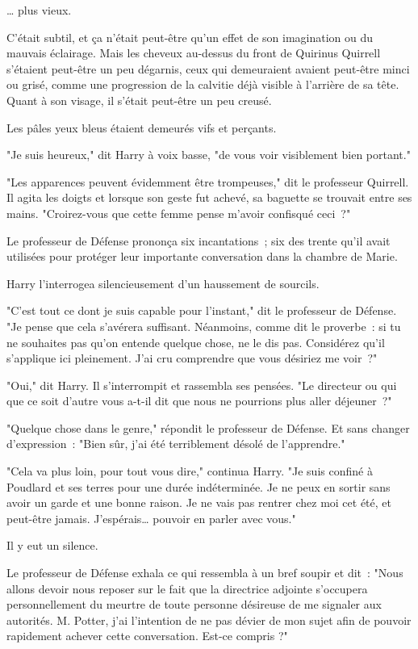 … plus vieux.

C'était subtil, et ça n'était peut-être qu'un effet de son imagination ou du mauvais éclairage. Mais les cheveux au-dessus du front de Quirinus Quirrell s'étaient peut-être un peu dégarnis, ceux qui demeuraient avaient peut-être minci ou grisé, comme une progression de la calvitie déjà visible à l'arrière de sa tête. Quant à son visage, il s'était peut-être un peu creusé.

Les pâles yeux bleus étaient demeurés vifs et perçants.

"Je suis heureux," dit Harry à voix basse, "de vous voir visiblement bien portant."

"Les apparences peuvent évidemment être trompeuses," dit le professeur Quirrell. Il agita les doigts et lorsque son geste fut achevé, sa baguette se trouvait entre ses mains. "Croirez-vous que cette femme pense m'avoir confisqué ceci~?"

Le professeur de Défense prononça six incantations~; six des trente qu'il avait utilisées pour protéger leur importante conversation dans la chambre de Marie.

Harry l'interrogea silencieusement d'un haussement de sourcils.

"C'est tout ce dont je suis capable pour l'instant," dit le professeur de Défense. "Je pense que cela s'avérera suffisant. Néanmoins, comme dit le proverbe~: si tu ne souhaites pas qu'on entende quelque chose, ne le dis pas. Considérez qu'il s'applique ici pleinement. J'ai cru comprendre que vous désiriez me voir~?"

"Oui," dit Harry. Il s'interrompit et rassembla ses pensées. "Le directeur ou qui que ce soit d'autre vous a-t-il dit que nous ne pourrions plus aller déjeuner~?"

"Quelque chose dans le genre," répondit le professeur de Défense. Et sans changer d'expression~: "Bien sûr, j'ai été terriblement désolé de l'apprendre."

"Cela va plus loin, pour tout vous dire," continua Harry. "Je suis confiné à Poudlard et ses terres pour une durée indéterminée. Je ne peux en sortir sans avoir un garde et une bonne raison. Je ne vais pas rentrer chez moi cet été, et peut-être jamais. J'espérais… pouvoir en parler avec vous."

Il y eut un silence.

Le professeur de Défense exhala ce qui ressembla à un bref soupir et dit~: "Nous allons devoir nous reposer sur le fait que la directrice adjointe s'occupera personnellement du meurtre de toute personne désireuse de me signaler aux autorités. M. Potter, j'ai l'intention de ne pas dévier de mon sujet afin de pouvoir rapidement achever cette conversation. Est-ce compris ?"

